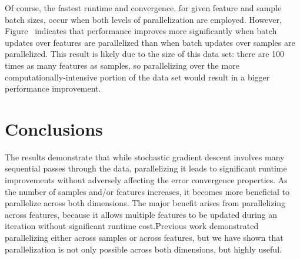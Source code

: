 \documentclass{article}
\begin{document}
Of course, the fastest runtime and convergence, for given feature and sample batch sizes, occur when both levels of parallelization are employed. However, Figure~\cite{fig:NAME} indicates that performance improves more significantly when batch updates over features are parallelized than when batch updates over samples are parallelized. This result is likely due to the size of this data set: there are 100 times as many features as samples, so parallelizing over the more computationally-intensive portion of the data set would result in a bigger performance improvement.

\section{Conclusions}
The results demonstrate that while stochastic gradient descent involves many sequential passes through the data, parallelizing it leads to significant runtime improvements without adversely affecting the error convergence properties.  As the number of samples and/or features increases, it becomes more beneficial to parallelize across both dimensions.  The major benefit arises from parallelizing across features, because it allows multiple features to be updated during an iteration without significant runtime cost.Previous work demonstrated parallelizing either across samples or across features, but we have shown that parallelization is not only possible across both dimensions, but highly useful.



\end{document}
